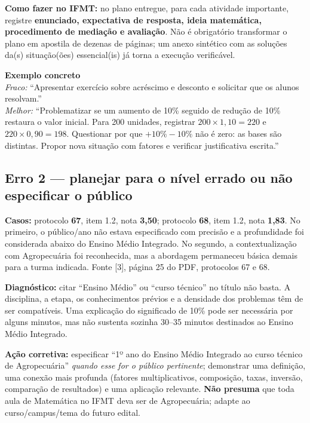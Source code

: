 \documentclass[11pt,a4paper]{article}
\begin{document}
\textbf{Como fazer no IFMT:} no plano entregue, para cada atividade importante, registre \textbf{enunciado, expectativa de resposta, ideia matemática, procedimento de mediação e avaliação}. Não é obrigatório transformar o plano em apostila de dezenas de páginas; um anexo sintético com as soluções da(s) situação(ões) essencial(is) já torna a execução verificável.

\begin{destaque}
\textbf{Exemplo concreto}\\
\emph{Fraco:} ``Apresentar exercício sobre acréscimo e desconto e solicitar que os alunos resolvam.''\\
\emph{Melhor:} ``Problematizar se um aumento de 10\% seguido de redução de 10\% restaura o valor inicial. Para 200 unidades, registrar $200\times1{,}10=220$ e $220\times0{,}90=198$. Questionar por que $+10\%-10\%$ não é zero: as bases são distintas. Propor nova situação com fatores e verificar justificativa escrita.''
\end{destaque}

\subsection{Erro 2 --- planejar para o nível errado ou não especificar o público}
\textbf{Casos:} protocolo \textbf{67}, item 1.2, nota \textbf{3,50}; protocolo \textbf{68}, item 1.2, nota \textbf{1,83}. No primeiro, o público/ano não estava especificado com precisão e a profundidade foi considerada abaixo do Ensino Médio Integrado. No segundo, a contextualização com Agropecuária foi reconhecida, mas a abordagem permaneceu básica demais para a turma indicada. Fonte [3], página 25 do PDF, protocolos 67 e 68.

\textbf{Diagnóstico:} citar ``Ensino Médio'' ou ``curso técnico'' no título não basta. A disciplina, a etapa, os conhecimentos prévios e a densidade dos problemas têm de ser compatíveis. Uma explicação do significado de 10\% pode ser necessária por alguns minutos, mas não sustenta sozinha 30--35 minutos destinados ao Ensino Médio Integrado.

\textbf{Ação corretiva:} especificar ``1º ano do Ensino Médio Integrado ao curso técnico de Agropecuária'' \textit{quando esse for o público pertinente}; demonstrar uma definição, uma conexão mais profunda (fatores multiplicativos, composição, taxas, inversão, comparação de resultados) e uma aplicação relevante. \textbf{Não presuma} que toda aula de Matemática no IFMT deva ser de Agropecuária; adapte ao curso/campus/tema do futuro edital.
\end{document}
